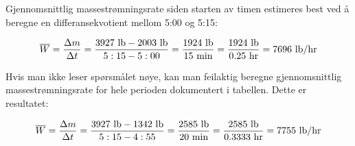 \vskip 10pt

Gjennomsnittlig massestrømningsrate siden starten av timen estimeres best ved å beregne en differansekvotient mellom 5:00 og 5:15:

$$\overline{W} = {\Delta m \over \Delta t} = {3927 \hbox{ lb} - 2003 \hbox{ lb} \over 5:15 - 5:00} = {1924 \hbox{ lb} \over 15 \hbox{ min}} = {1924 \hbox{ lb} \over 0.25 \hbox{ hr}} = 7696 \hbox{ lb/hr}$$

\vskip 10pt

Hvis man ikke leser spørsmålet nøye, kan man feilaktig beregne gjennomsnittlig massestrømningsrate for hele perioden dokumentert i tabellen. Dette er resultatet:

$$\overline{W} = {\Delta m \over \Delta t} = {3927 \hbox{ lb} - 1342 \hbox{ lb} \over 5:15 - 4:55} = {2585 \hbox{ lb} \over 20 \hbox{ min}} = {2585 \hbox{ lb} \over 0.3333 \hbox{ hr}} = 7755 \hbox{ lb/hr}$$



